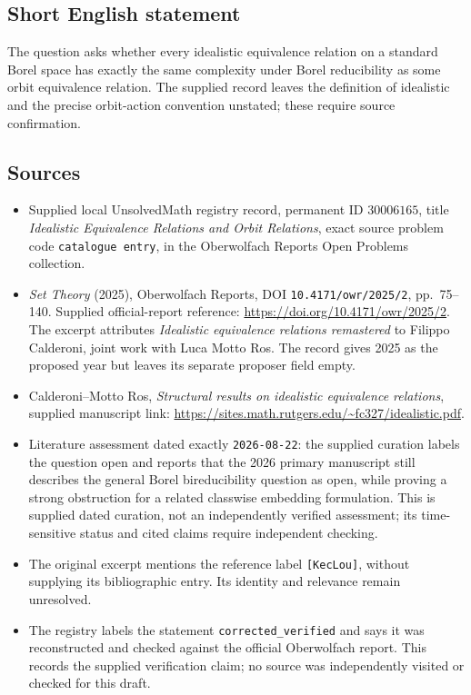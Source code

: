 \documentclass[11pt]{article}
\begin{document}
\subsection{Short English statement}
The question asks whether every idealistic equivalence relation on a standard Borel space has exactly the same complexity under Borel reducibility as some orbit equivalence relation. The supplied record leaves the definition of idealistic and the precise orbit-action convention unstated; these require source confirmation.
\subsection{Sources}
\begin{itemize}
\item Supplied local UnsolvedMath registry record, permanent ID \(30006165\), title \emph{Idealistic Equivalence Relations and Orbit Relations}, exact source problem code \texttt{catalogue entry}, in the Oberwolfach Reports Open Problems collection.
\item \emph{Set Theory} (2025), Oberwolfach Reports, DOI \texttt{10.4171/owr/2025/2}, pp.\ 75--140. Supplied official-report reference: \url{https://doi.org/10.4171/owr/2025/2}. The excerpt attributes \emph{Idealistic equivalence relations remastered} to Filippo Calderoni, joint work with Luca Motto Ros. The record gives 2025 as the proposed year but leaves its separate proposer field empty.
\item Calderoni--Motto Ros, \emph{Structural results on idealistic equivalence relations}, supplied manuscript link: \url{https://sites.math.rutgers.edu/~fc327/idealistic.pdf}.
\item Literature assessment dated exactly \texttt{2026-08-22}: the supplied curation labels the question open and reports that the 2026 primary manuscript still describes the general Borel bireducibility question as open, while proving a strong obstruction for a related classwise embedding formulation. This is supplied dated curation, not an independently verified assessment; its time-sensitive status and cited claims require independent checking.
\item The original excerpt mentions the reference label \texttt{[KecLou]}, without supplying its bibliographic entry. Its identity and relevance remain unresolved.
\item The registry labels the statement \texttt{corrected\_verified} and says it was reconstructed and checked against the official Oberwolfach report. This records the supplied verification claim; no source was independently visited or checked for this draft.
\end{itemize}
\end{document}
